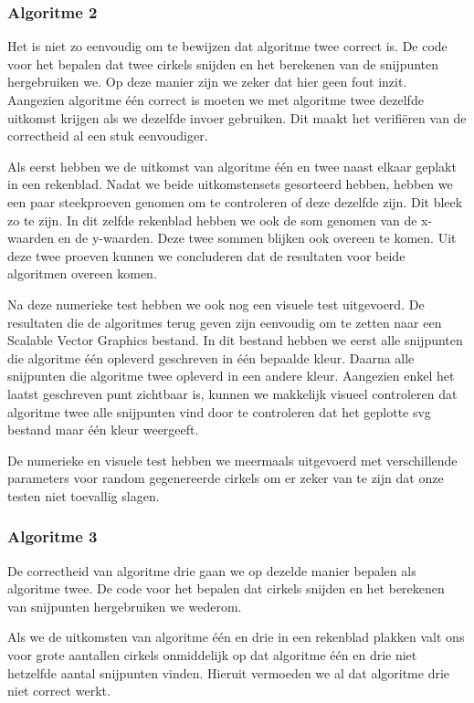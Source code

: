 \documentclass[11pt,a4paper]{article}
\begin{document}
\subsubsection*{Algoritme 2}

Het is niet zo eenvoudig om te bewijzen dat algoritme twee correct is. De code voor het bepalen dat twee cirkels snijden en het berekenen van de snijpunten hergebruiken we. Op deze manier zijn we zeker dat hier geen fout inzit.
Aangezien algoritme \'e\'en correct is moeten we met algoritme twee dezelfde uitkomst krijgen als we dezelfde invoer gebruiken. Dit maakt het verifi\"eren van de correctheid al een stuk eenvoudiger.

Als eerst hebben we de uitkomst van algoritme \'e\'en en twee naast elkaar geplakt in een rekenblad. Nadat we beide uitkomstensets gesorteerd hebben, hebben we een paar steekproeven genomen om te controleren of deze dezelfde zijn. Dit bleek zo te zijn. In dit zelfde rekenblad hebben we ook de som genomen van de x-waarden en de y-waarden. Deze twee sommen blijken ook overeen te komen. Uit deze twee proeven kunnen we concluderen dat de resultaten voor beide algoritmen overeen komen.

Na deze numerieke test hebben we ook nog een visuele test uitgevoerd. De resultaten die de algoritmes terug geven zijn eenvoudig om te zetten naar een Scalable Vector Graphics bestand. In dit bestand hebben we eerst alle snijpunten die algoritme \'e\'en opleverd geschreven in \'e\'en bepaalde kleur. Daarna alle snijpunten die algoritme twee opleverd in een andere kleur. Aangezien enkel het laatst geschreven punt zichtbaar is, kunnen we makkelijk visueel controleren dat algoritme twee alle snijpunten vind door te controleren dat het geplotte svg bestand maar \'e\'en kleur weergeeft.

De numerieke en visuele test hebben we meermaals uitgevoerd met verschillende parameters voor random gegenereerde cirkels om er zeker van te zijn dat onze testen niet toevallig slagen.

\subsubsection*{Algoritme 3}

De correctheid van algoritme drie gaan we op dezelde manier bepalen als algoritme twee. De code voor het bepalen dat cirkels snijden en het berekenen van snijpunten hergebruiken we wederom.

Als we de uitkomsten van algoritme \'e\'en en drie in een rekenblad plakken valt ons voor grote aantallen cirkels onmiddelijk op dat algoritme \'e\'en en drie niet hetzelfde aantal snijpunten vinden. Hieruit vermoeden we al dat algoritme drie niet correct werkt.
\end{document}
